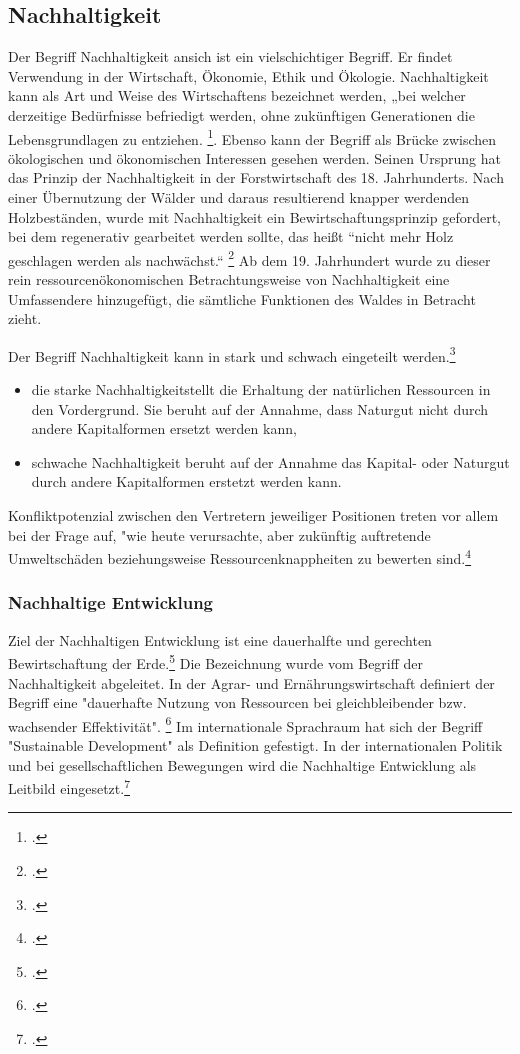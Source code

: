 \documentclass{scrartcl}
\begin{document}
\subsection{Nachhaltigkeit}

Der Begriff Nachhaltigkeit ansich ist ein vielschichtiger Begriff. Er findet Verwendung in der Wirtschaft, Ökonomie, Ethik und Ökologie. Nachhaltigkeit kann als Art und Weise des Wirtschaftens bezeichnet werden, „bei welcher derzeitige Bedürfnisse befriedigt werden, ohne zukünftigen Generationen die Lebensgrundlagen zu entziehen. \footcite{DefinitionWirtschaftslexikonb}. Ebenso kann der Begriff als Brücke zwischen ökologischen und ökonomischen Interessen gesehen werden. Seinen Ursprung hat das Prinzip der Nachhaltigkeit in der Forstwirtschaft des 18. Jahrhunderts. Nach einer Übernutzung der Wälder und daraus resultierend knapper werdenden Holzbeständen, wurde mit Nachhaltigkeit ein Bewirtschaftungsprinzip gefordert, bei dem regenerativ gearbeitet werden sollte, das heißt “nicht mehr Holz geschlagen werden als nachwächst.“ \footcite{NachhaltigeBrockhaus.de}
Ab dem 19. Jahrhundert wurde zu dieser rein ressourcenökonomischen Betrachtungsweise von Nachhaltigkeit eine Umfassendere hinzugefügt, die sämtliche Funktionen des Waldes in Betracht zieht.

\hfill \break
Der Begriff Nachhaltigkeit kann in stark und schwach eingeteilt werden.\footcite{Nachhaltigkeit}


\begin{itemize}
\item die starke Nachhaltigkeitstellt die Erhaltung der natürlichen Ressourcen in den Vordergrund. Sie beruht auf der Annahme, dass Naturgut nicht durch andere Kapitalformen ersetzt werden kann,
\item schwache Nachhaltigkeit beruht auf der Annahme das Kapital- oder Naturgut durch andere Kapitalformen erstetzt werden kann.
\end{itemize}
Konfliktpotenzial zwischen den Vertretern jeweiliger Positionen treten vor allem bei der Frage auf, "wie heute verursachte, aber zukünftig auftretende Umweltschäden beziehungsweise Ressourcenknappheiten zu bewerten sind.\footcite{NachhaltigeBrockhaus.de}



\subsubsection{Nachhaltige Entwicklung}
  Ziel der Nachhaltigen Entwicklung ist eine dauerhalfte und gerechten Bewirtschaftung der Erde.\footcite{NachhaltigeBrockhaus.de} Die Bezeichnung wurde vom Begriff der Nachhaltigkeit abgeleitet. In der Agrar- und Ernährungswirtschaft definiert der Begriff eine "dauerhafte Nutzung von Ressourcen bei gleichbleibender bzw. wachsender Effektivität". \footcite{oppenhauser2010nachhaltigkeit} Im internationale Sprachraum hat sich der Begriff "Sustainable Development" als Definition gefestigt. In der internationalen Politik und bei gesellschaftlichen Bewegungen wird die Nachhaltige Entwicklung als Leitbild eingesetzt.\footcite{oppenhauser2010nachhaltigkeit}
 
\end{document}
